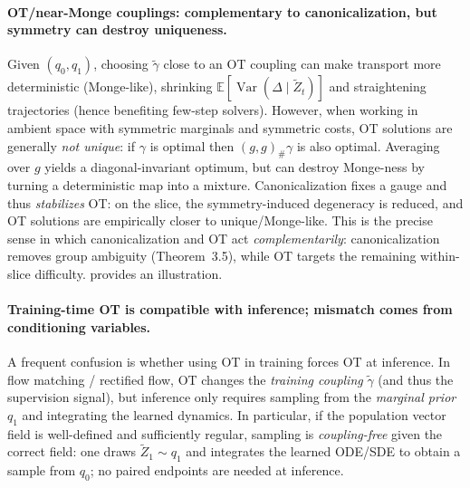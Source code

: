 \documentclass{article}
\theoremstyle{plain}
\theoremstyle{definition}
\theoremstyle{remark}
\newcommand{\1}{\mathbf{1}}
\begin{document}
\paragraph{OT/near-Monge couplings: complementary to canonicalization, but symmetry can destroy uniqueness.}
Given $(q_0,q_1)$, choosing $\widetilde\gamma$ close to an OT coupling can make transport more deterministic (Monge-like), shrinking
$\mathbb{E}[\operatorname{Var}(\Delta\mid \widetilde Z_t)]$ and straightening trajectories (hence benefiting few-step solvers).
However, when working in ambient space with symmetric marginals and symmetric costs, OT solutions are generally \emph{not unique}:
if $\gamma$ is optimal then $(g,g)_{\#}\gamma$ is also optimal. Averaging over $g$ yields a diagonal-invariant optimum, but can destroy
Monge-ness by turning a deterministic map into a mixture. Canonicalization fixes a gauge and thus \emph{stabilizes} OT: on the slice,
the symmetry-induced degeneracy is reduced, and OT solutions are empirically closer to unique/Monge-like. This is the precise sense in
which canonicalization and OT act \emph{complementarily}: canonicalization removes group ambiguity (Theorem~3.5), while OT targets the
remaining within-slice difficulty.  provides an illustration.

\paragraph{Training-time OT is compatible with inference; mismatch comes from conditioning variables.}
A frequent confusion is whether using OT in training forces OT at inference. In flow matching / rectified flow, OT changes the \emph{training
coupling} $\widetilde\gamma$ (and thus the supervision signal), but inference only requires sampling from the \emph{marginal prior} $q_1$ and
integrating the learned dynamics. In particular, if the population vector field is well-defined and sufficiently regular, sampling is
\emph{coupling-free} given the correct field: one draws $\widetilde Z_1\sim q_1$ and integrates the learned ODE/SDE to obtain a sample from
$q_0$; no paired endpoints are needed at inference.
\end{document}
